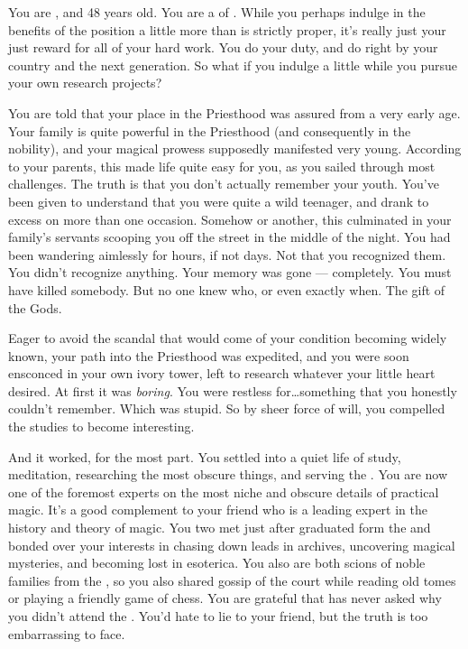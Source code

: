 \documentclass[char]{GL2020}
\begin{document}
\name{\cHedonist{}}

You are \cHedonist{\intro}, and 48 years old. You are a \cHedonist{\cleric} of \cFarmGod{\intro}. While you perhaps indulge in the benefits of the position a little more than is strictly proper, it’s really just your just reward for all of your hard work. You do your duty, and do right by your country and the next generation. So what if you indulge a little while you pursue your own research projects?

You are told that your place in the Priesthood was assured from a very early age. Your family is quite powerful in the Priesthood (and consequently in the nobility), and your magical prowess supposedly manifested very young. According to your parents, this made life quite easy for you, as you sailed through most challenges. The truth is that you don’t actually remember your youth. You’ve been given to understand that you were quite a wild teenager, and drank to excess on more than one occasion. Somehow or another, this culminated in your family’s servants scooping you off the street in the middle of the night. You had been wandering aimlessly for hours, if not days. Not that you recognized them. You didn’t recognize anything. Your memory was gone — completely. You must have killed somebody. But no one knew who, or even exactly when. The gift of the Gods.

Eager to avoid the scandal that would come of your condition becoming widely known, your path into the Priesthood was expedited, and you were soon ensconced in your own ivory tower, left to research whatever your little heart desired. At first it was \emph{boring}. You were restless for\ldots something that you honestly couldn’t remember. Which was stupid. So by sheer force of will, you compelled the studies to become interesting.

And it worked, for the most part. You settled into a quiet life of study, meditation, researching the most obscure things, and serving the \pFarmers{}. You are now one of the foremost experts on  the most niche and obscure details of practical magic. It’s a good complement to your friend \cWildCard{\intro} who is a leading expert in the history and theory of magic. You two met just after \cWildCard{\they} graduated form the \pSchool{} and bonded over your interests in chasing down leads in archives, uncovering magical mysteries, and becoming lost in esoterica. You also are both scions of noble families from the \pFarm{}, so you also shared gossip of the court while reading old tomes or playing a friendly game of chess. You are grateful that \cWildCard{} has never asked why you didn’t attend the \pSc{}. You’d hate to lie to your friend, but the truth is too embarrassing to face.
\end{document}
